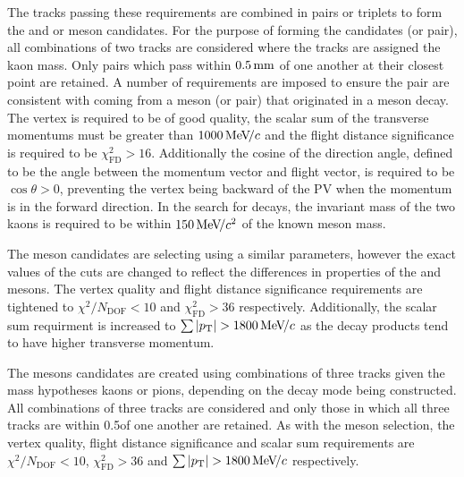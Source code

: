 
The tracks passing these requirements are combined in pairs or triplets to form the \Dsp and \phiz or \Dzb meson candidates.  
For the purpose of forming the \phiz candidates (or \Kp\Km pair), all combinations of two tracks are considered where the tracks are assigned the kaon mass. Only pairs which pass within $0.5\mathrm{ \,mm}$ of one another at their closest point are retained. A number of requirements are imposed to ensure the pair are consistent with coming from a \phiz meson (or \Kp\Km pair) that originated in a \Bp meson decay. The vertex is required to be of good quality, the scalar sum of the transverse momentums must be greater than $1000{\mathrm{\,Me\kern -0.1em V\!/}c}$ and the flight distance significance is required to be $\chi^{2}_{\text{FD} } > 16$. Additionally the cosine of the direction angle, defined to be the angle between the momentum vector and flight vector, is required to be $\cos{\theta}>0$, preventing the vertex being backward of the PV when the momentum is in the forward direction. In the search for \decay{\Bp}{\Dsp\phiz} decays, the invariant mass of the two kaons is required to be within $150{\mathrm{\,Me\kern -0.1em V\!/}c^2}$ of the known \phiz meson mass.  

The \Dzb meson candidates are selecting using a similar parameters, however the exact values of the cuts are changed to reflect the differences in properties of the \phiz and \Dzb mesons. The vertex quality and flight distance significance requirements are tightened to $\chi^{2}/N_{\text{DOF}} < 10$ and $\chi^{2}_{\text{FD} }  > 36$ respectively. Additionally, the scalar \pt sum requirment is increased to $\sum{|\pt|} > 1800 \mevc$ as the decay products tend to have higher transverse momentum. 


The \Dsp mesons candidates are created using combinations of three tracks given the mass hypotheses kaons or pions, depending on the decay mode being constructed. All combinations of three tracks are considered and only those in which all three tracks are within 0.5\mm of one another are retained. As with the \Dzb meson selection, the vertex quality, flight distance significance and scalar \pt sum requirements are $\chi^{2}/N_{\text{DOF}} < 10$, $\chi^{2}_{\text{FD} }  > 36$ and $\sum{|\pt|} > 1800 \mevc$ respectively.



